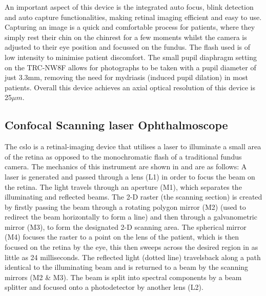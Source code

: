 An important aspect of this device is the integrated auto focus, blink
detection and auto capture functionalities, making retinal imaging efficient
and easy to use. Capturing an image is a quick and comfortable process
for patients, where they simply rest their chin on the chinrest for a few
moments whilst the camera is adjusted to their eye position and focussed
on the fundus. The flash used is of low intensity to minimise patient
discomfort. The small pupil diaphragm setting on the TRC-NW8F allows
for photographs to be
taken with a pupil diameter of just 3.3mm, removing the need for mydriasis
(induced pupil dilation) in most patients. Overall this device achieves
an axial optical resolution of this device is 25$\mu m$.


\subsection{Confocal Scanning \gls{laser} Ophthalmoscope}

The \Gls{cslo} is a retinal-imaging device that utilises a \gls{laser} to illuminate a small area of the retina as
opposed to the monochromatic flash of a traditional fundus camera.
The mechanics of this instrument are shown in  and are as
follows: A \gls{laser} is generated and passed through a lens (L1) in order
to focus the beam on the retina. The light travels through an aperture (M1),
which separates the illuminating and reflected beams. The 2-D raster (the
scanning section) is created by firstly passing the beam through a rotating
polygon mirror (M2) (used to redirect the beam horizontally to form a line)
and then through a galvanometric mirror (M3), to form the designated 2-D
scanning area. The spherical mirror (M4) focuses the raster to a point
on the lens of the patient, which is then focused on the retina by the eye,
this then sweeps across the desired region in as little as 24 milliseconds.
The reflected light (dotted line) travelsback along a path identical to the
illuminating beam and is returned to a beam by the scanning mirrors (M2 \&
M3). The beam is split into spectral components by a beam splitter and
focused onto a photodetector by another lens (L2).\cite{webb1987confocal}


